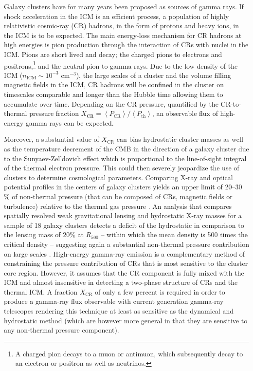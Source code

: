 \documentclass[12pt,manuscript]{aastex}
\newcommand{\expval}[1]{\left\langle #1 \right\rangle}
\newcommand{\CR}{\mathrm{CR}}
\begin{document}
Galaxy clusters have for many years been proposed as sources of gamma rays. If shock acceleration in the ICM is an efficient process, a population of highly relativistic cosmic-ray (CR) hadrons, in the form of protons and heavy ions, in the ICM is to be expected. The main energy-loss mechanism for CR hadrons at high energies is pion production through the interaction of CRs with nuclei in the ICM. Pions are short lived and decay; the charged pions to electrons and positrons,\footnote{A charged pion decays to a muon or antimuon, which subsequently decay to an electron or positron as well as neutrinos.} and the neutral pion to gamma rays. Due to the low density of the ICM ($n_{\mathrm{ICM}}\sim 10^{-3}$ cm$^{-3}$), the large scales of a cluster and the volume filling magnetic fields in the ICM, CR hadrons will be confined in the cluster on timescales comparable and longer than the Hubble time \citep[][]{article:Volk_etal:1996, article:Berezinsky_etal:1997} allowing them to accumulate over time.  Depending on the CR pressure, quantified by the CR-to-thermal pressure fraction $X_\CR=\expval{P_{\CR}}/\expval{P_{\mathrm{th}}}$, an observable flux of high-energy gamma rays can be expected.

Moreover, a substantial value of $X_\CR$ can bias hydrostatic cluster masses as well as the temperature decrement of the CMB in the direction of a galaxy cluster due to the Sunyaev-Zel'dovich effect which is proportional to the line-of-sight integral of the thermal electron pressure. This could then severely jeopardize the use of clusters to determine cosmological parameters. Comparing X-ray and optical potential profiles in the centers of galaxy clusters yields an upper limit of 20--30 \% of non-thermal pressure (that can be composed of CRs, magnetic fields or turbulence) relative to the thermal gas pressure \citep{article:Churazov_etal:2008, article:Churazov_etal:2010}. An analysis that compares spatially resolved weak gravitational lensing and hydrostatic X-ray masses for a sample of 18 galaxy clusters detects a deficit of the hydrostatic in comparison to the lensing mass of $20 \%$ at $R_{500}$ -- within which the
mean density is 500 times the critical density -- suggesting again a substantial non-thermal pressure contribution on large scales \citep{article:Mahdavi_etal:2008}. High-energy gamma-ray emission is a complementary method of constraining the pressure contribution of CRs that is most sensitive
to the cluster core region. However, it assumes that the CR component is fully mixed with the ICM and almost insensitive in detecting a two-phase structure of CRs and the thermal ICM.  A fraction $X_\CR$ of only a few percent is required in order to produce a gamma-ray flux observable with current generation
gamma-ray telescopes rendering this technique at least as sensitive as the dynamical and hydrostatic method (which are however more general in that they are sensitive to any non-thermal pressure component).
\end{document}
